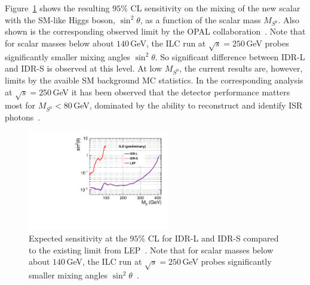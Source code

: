 % 

Figure~\ref{fig:extraH:limit} shows the resulting $95\%$ CL sensitivity on the mixing of the new scalar with the SM-like Higgs boson, $\sin^2{\theta}$, as a function of the scalar mass $M_{S^0}$. Also shown is the corresponding observed limit by the OPAL collaboration~\cite{Abbiendi:2002qp}. Note that for scalar masses below about $140$\,GeV, the ILC run at $\sqrt{s}=250$\,GeV probes significantly smaller mixing angles $\sin^2{\theta}$. So significant difference between IDR-L and IDR-S is observed at this level. At low $M_{S^0}$, the current results are, however, limits by the avaible SM background MC statistics. In the corresponding analysis at $\sqrt{s}=250$\,GeV it has been observed that the detector performance matters most for $M_{S^0}<80$\,GeV, dominated by the ability to reconstruct and identify ISR photons~\cite{FIPnote:ESU_BSM}.

\begin{figure}[htbp]
\begin{center} 
\includegraphics[width=0.55\textwidth]{Performance/fig/exclusion_limits_compare_LEP.pdf}
\end{center}
\caption{Expected sensitivity at the $95\%$ CL for IDR-L and IDR-S compared to the existing limit from LEP~\cite{Abbiendi:2002qp}. Note that for scalar masses below about $140$\,GeV, the ILC run at $\sqrt{s}=250$\,GeV probes significantly smaller mixing angles $\sin^2{\theta}$~\cite{FIPnote:ESU_BSM}.}
\label{fig:extraH:limit}
\end{figure}



